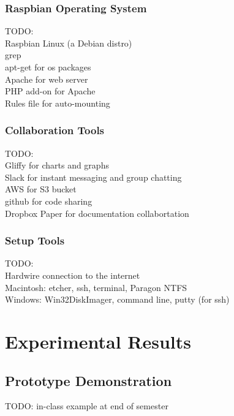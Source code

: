 \documentclass[12pt]{article}
\begin{document}
\subsubsection {Raspbian Operating System}

TODO:\\
Raspbian Linux (a Debian distro)\\
grep\\
apt-get for os packages\\
Apache for web server\\
PHP add-on for Apache\\
Rules file for auto-mounting\\


\subsubsection{Collaboration Tools}

TODO:\\
Gliffy for charts and graphs\\
Slack for instant messaging and group chatting\\
AWS for S3 bucket\\
github for code sharing\\
Dropbox Paper for documentation collabortation\\

\subsubsection{Setup Tools}

TODO:\\
Hardwire connection to the internet\\
Macintosh: etcher, ssh, terminal, Paragon NTFS\\
Windows: Win32DiskImager, command line, putty (for ssh)\\


\section{Experimental Results}
\label{sect-experimentalResults}

\subsection{Prototype Demonstration}

TODO: in-class example at end of semester\\
\end{document}
